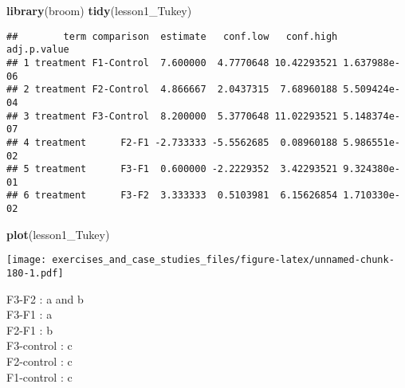 \documentclass[]{book}
\newenvironment{Shaded}{\begin{snugshade}}{\end{snugshade}}
\newcommand{\DataTypeTok}[1]{\textcolor[rgb]{0.13,0.29,0.53}{#1}}
\newcommand{\DecValTok}[1]{\textcolor[rgb]{0.00,0.00,0.81}{#1}}
\newcommand{\FloatTok}[1]{\textcolor[rgb]{0.00,0.00,0.81}{#1}}
\newcommand{\KeywordTok}[1]{\textcolor[rgb]{0.13,0.29,0.53}{\textbf{#1}}}
\newcommand{\NormalTok}[1]{#1}
\newcommand{\OperatorTok}[1]{\textcolor[rgb]{0.81,0.36,0.00}{\textbf{#1}}}
\newcommand{\StringTok}[1]{\textcolor[rgb]{0.31,0.60,0.02}{#1}}
\theoremstyle{definition}
\theoremstyle{definition}
\theoremstyle{definition}
\theoremstyle{remark}
\begin{document}
\begin{Shaded}
\begin{Highlighting}[]
\KeywordTok{library}\NormalTok{(broom)}
\KeywordTok{tidy}\NormalTok{(lesson1_Tukey)}
\end{Highlighting}
\end{Shaded}

\begin{verbatim}
##        term comparison  estimate   conf.low   conf.high  adj.p.value
## 1 treatment F1-Control  7.600000  4.7770648 10.42293521 1.637988e-06
## 2 treatment F2-Control  4.866667  2.0437315  7.68960188 5.509424e-04
## 3 treatment F3-Control  8.200000  5.3770648 11.02293521 5.148374e-07
## 4 treatment      F2-F1 -2.733333 -5.5562685  0.08960188 5.986551e-02
## 5 treatment      F3-F1  0.600000 -2.2229352  3.42293521 9.324380e-01
## 6 treatment      F3-F2  3.333333  0.5103981  6.15626854 1.710330e-02
\end{verbatim}

\begin{Shaded}
\begin{Highlighting}[]
\KeywordTok{plot}\NormalTok{(lesson1_Tukey)}
\end{Highlighting}
\end{Shaded}

\texttt{[image: exercises\_and\_case\_studies\_files/figure-latex/unnamed-chunk-180-1.pdf]}

F3-F2 : a and b\\
F3-F1 : a\\
F2-F1 : b\\
F3-control : c\\
F2-control : c\\
F1-control : c

\begin{Shaded}
\end{Shaded}
\end{document}
